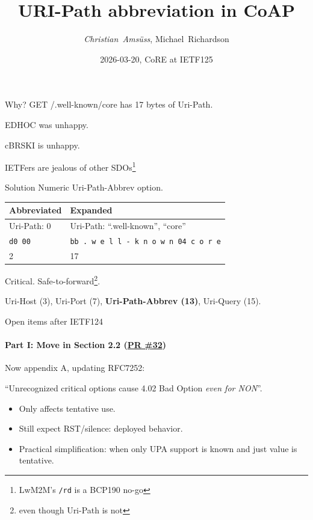 

\title{URI-Path abbreviation in CoAP}
\subtitle{}
\author{\textit{Christian~Amsüss}, Michael~Richardson}
\date{2026-03-20, CoRE at IETF125}



\frame{\titlepage}

\begin{frame}{\color{gray}Why?}\Large\color{gray}
  GET /.well-known/core has 17 bytes of Uri-Path.

  \bigskip

  EDHOC was unhappy.

  \bigskip

  cBRSKI is unhappy.

  \bigskip

  IETFers are jealous of other SDOs\footnote{LwM2M's \texttt{/rd} is a BCP190 no-go}
\end{frame}

\begin{frame}{\color{gray}Solution}\Large\color{gray}
  Numeric Uri-Path-Abbrev option.

  \bigskip

  \begin{tabular}{l|l}
    Abbreviated & Expanded \\ \hline
    Uri-Path: 0 \hspace{1cm} & Uri-Path: ``.well-known'', ``core'' \\
    \texttt{d0 00} & \texttt{bb . w e l l - k n o w n 04 c o r e} \\
    2 & 17 \\
  \end{tabular}

  \bigskip

  Critical. Safe-to-forward\footnote{even though Uri-Path is not}.

  \bigskip

  Uri-Host (3), Uri-Port (7), \textbf{Uri-Path-Abbrev (13)}, Uri-Query (15).
\end{frame}

\begin{frame}{Open items after IETF124}\Large
  \framesubtitle{Part I: Move in  Section 2.2 (\href{https://github.com/core-wg/uri-path-abbrev/pull/32}{PR \#32})}

  Now appendix A, updating RFC7252:
  
  \bigskip

  ``Unrecognized critical options cause 4.02 Bad Option \textit{even for NON}''.
  
  \vspace{1cm}

  \begin{itemize}
    \item Only affects tentative use.
    \item Still expect RST/silence: deployed behavior.
    \item Practical simplification: when only UPA support is known and just value is tentative.
  \end{itemize}
\end{frame}

